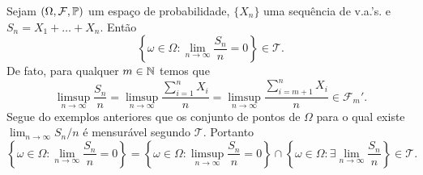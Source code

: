 \begin{exemplo}
	Sejam $(\Omega,\mathcal{F},\mathbb{P})$ um espaço de probabilidade,
	$\{X_n\}$ uma sequência de v.a.'s. e $S_n=X_1+\ldots+X_n$.
	Então 
	\[
		\left\{
			\omega\in \Omega: 
			\lim_{n\to\infty} \frac{S_n}{n}=0
		\right\}
		\in
		\mathcal{T}.
	\]
	De fato, para qualquer $m\in\mathbb{N}$ temos que
		\[
			\limsup_{n\to\infty} \frac{S_n}{n}
			=
			\limsup_{n\to\infty} \frac{\sum_{i=1}^n X_i}{n}
			=
			\limsup_{n\to\infty} \frac{\sum_{i=m+1}^n X_i}{n}
			\in
			\mathcal{F}_{m}'.
		\]
	Segue do exemplos anteriores que os conjunto de pontos 
	de $\Omega$ para o qual existe $\lim_{n\to\infty} S_n/n$ 
	é mensurável segundo $\mathcal{T}$. Portanto
	\[
		\left\{
			\omega\in \Omega: 
			\lim_{n\to\infty} \frac{S_n}{n}=0
		\right\}
		=
		\left\{
			\omega\in \Omega: 
			\limsup_{n\to\infty} \frac{S_n}{n}=0
		\right\}
		\cap
		\left\{
			\omega\in \Omega: 
			\exists \lim_{n\to\infty} \frac{S_n}{n}
		\right\}
		\in
		\mathcal{T}.
	\]
\end{exemplo}